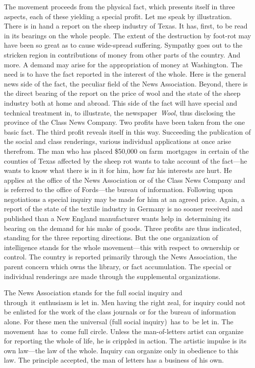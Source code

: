 \documentclass[openany,nobib]{tufte-book}
\begin{document}
The movement proceeds from the physical fact, which presents itself in
three aspects, each of these yielding a special profit. Let me speak by
illustration. There is in hand a report on the sheep industry of Texas.
It has, first, to be read in its bearings on the whole people. The
extent of the destruction by foot-rot may have been so great as to cause
wide-spread suffering. Sympathy goes out to the stricken region in
contributions of money from other parts of the country. And more. A
demand may arise for the appropriation of money at Washington. The need
is to have the fact reported in the interest of the whole. Here is the
general news side of the fact, the peculiar field of the News
Association. Beyond, there is the direct bearing of the report on the
price of wool and the state of the sheep industry both at home and
abroad. This side of the fact will have special and technical treatment
in, to illustrate, the newspaper~\emph{Wool}, thus disclosing the
province of the Class News Company. Two profits have been taken from the
one basic fact. The third profit reveals itself in this way. Succeeding
the publication of the social and class renderings, various individual
applications at once arise therefrom. The man who has placed \$50,000 on
farm~mortgages~in certain of the counties of Texas affected by the sheep
rot wants to take account of the fact---he wants to know what there is
in it for him, how far his interests are hurt. He applies at the office
of the News Association or of the Class News Company and is referred to
the office of Fords---the bureau of information. Following upon
negotiations a special inquiry may be made for him at an agreed price.
Again, a report of the state of the textile industry in Germany is no
sooner received and published than a New England manufacturer wants help
in~determining its bearing on the demand for his make of goods. Three
profits are thus indicated, standing for the three reporting directions.
But the one organization of intelligence stands for the whole
movement---this with respect to ownership or control. The country is
reported primarily through the News Association, the parent concern
which owns the library, or fact accumulation. The special or individual
renderings are made through the supplemental organizations.~

The News Association stands for the full social inquiry and
through~it~enthusiasm is let in. Men having the right zeal, for inquiry
could not be enlisted for the work of the class journals or for the
bureau of information alone. For these men the universal (full social
inquiry)~has to~be let in. The movement~has~to~come full circle. Unless
the man-of-letters artist can organize for reporting the whole of life,
he is crippled in action. The artistic impulse is its own law---the law
of the whole. Inquiry can organize only in obedience to this law. The
principle accepted, the man of letters has a business of his own.~
\end{document}
